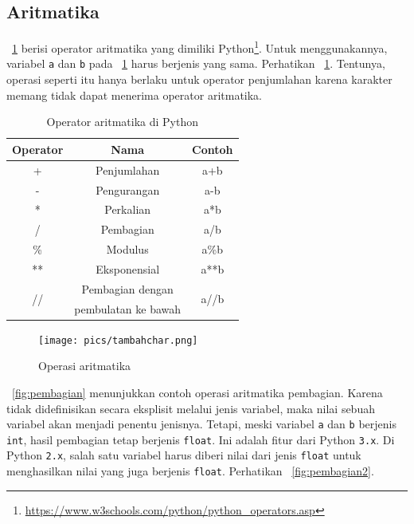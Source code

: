 \subsection{Aritmatika}
\tablename~\ref{tab:aritmatika} berisi operator aritmatika yang dimiliki Python\footnote{\url{https://www.w3schools.com/python/python_operators.asp}}. Untuk menggunakannya, variabel \texttt{a} dan \texttt{b} pada \tablename~\ref{tab:aritmatika} harus berjenis yang sama. Perhatikan \figurename~\ref{fig:aritmatika}. Tentunya, operasi seperti itu hanya berlaku untuk operator penjumlahan karena karakter memang tidak dapat menerima operator aritmatika.

\begin{table}[h]
\caption{Operator aritmatika di Python}
\label{tab:aritmatika}
  \begin{center}
    \begin{tabular}{@{}ccc@{}}\toprule
    Operator & Nama  & Contoh\\ \midrule
  +  & Penjumlahan & a+b \\ 
  - & Pengurangan & a-b \\
  * & Perkalian & a*b\\
  / & Pembagian & a/b\\
  \% & Modulus & a\%b \\
  ** & Eksponensial & a**b \\
  \multirow{2}{*}{//} & Pembagian dengan & \multirow{2}{*}{a//b} \\
  & pembulatan ke bawah & \\
       \bottomrule
    \end{tabular}
  \end{center}
\end{table}

\begin{figure}
  \begin{center}
    \texttt{[image: pics/tambahchar.png]}
    \caption{Operasi aritmatika}
    \label{fig:aritmatika}
  \end{center}
\end{figure}

\figurename~\ref{fig:pembagian} menunjukkan contoh operasi aritmatika pembagian. Karena tidak didefinisikan secara eksplisit melalui jenis variabel, maka nilai sebuah variabel akan menjadi penentu jenisnya. Tetapi, meski variabel \texttt{a} dan \texttt{b} berjenis \texttt{int}, hasil pembagian tetap berjenis \texttt{float}. Ini adalah fitur dari Python \texttt{3.x}. Di Python \texttt{2.x}, salah satu variabel harus diberi nilai dari jenis \texttt{float} untuk menghasilkan nilai yang juga berjenis \texttt{float}. Perhatikan \figurename~\ref{fig:pembagian2}.

